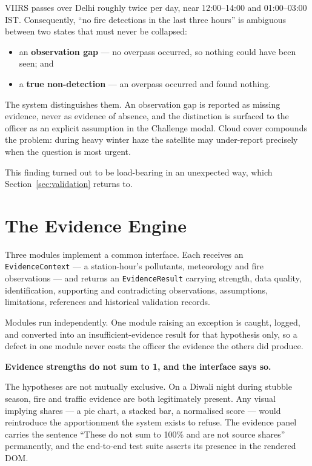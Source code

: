 \documentclass[11pt,a4paper]{article}
\newcommand{\keyclaim}[1]{%
  \par\vspace{0.7ex}\noindent
  \colorbox{vwash}{\parbox{\dimexpr\linewidth-2\fboxsep}{%
    \color{vblack}\textbf{#1}}}%
  \par\vspace{0.9ex}}
\newcommand{\code}[1]{\texttt{\small #1}}
\begin{document}
VIIRS passes over Delhi roughly twice per day, near 12:00--14:00 and 01:00--03:00
IST. Consequently, ``no fire detections in the last three hours'' is ambiguous
between two states that must never be collapsed:

\begin{itemize}
  \item an \textbf{observation gap} --- no overpass occurred, so nothing could have
  been seen; and
  \item a \textbf{true non-detection} --- an overpass occurred and found nothing.
\end{itemize}

The system distinguishes them. An observation gap is reported as missing evidence,
never as evidence of absence, and the distinction is surfaced to the officer as an
explicit assumption in the Challenge modal. Cloud cover compounds the problem:
during heavy winter haze the satellite may under-report precisely when the question
is most urgent.

This finding turned out to be load-bearing in an unexpected way, which
Section~\ref{sec:validation} returns to.

\section{The Evidence Engine}

Three modules implement a common interface. Each receives an
\code{EvidenceContext} --- a station-hour's pollutants, meteorology and fire
observations --- and returns an \code{EvidenceResult} carrying strength, data
quality, identification, supporting and contradicting observations, assumptions,
limitations, references and historical validation records.

Modules run independently. One module raising an exception is caught, logged, and
converted into an insufficient-evidence result for that hypothesis only, so a
defect in one module never costs the officer the evidence the others did produce.

\keyclaim{Evidence strengths do not sum to 1, and the interface says so.}

The hypotheses are not mutually exclusive. On a Diwali night during stubble season,
fire and traffic evidence are both legitimately present. Any visual implying shares
--- a pie chart, a stacked bar, a normalised score --- would reintroduce the
apportionment the system exists to refuse. The evidence panel carries the sentence
``These do not sum to 100\% and are not source shares'' permanently, and the
end-to-end test suite asserts its presence in the rendered DOM.
\end{document}
